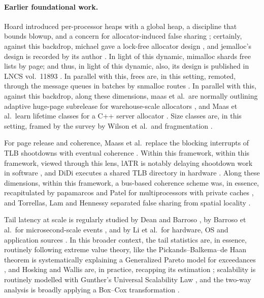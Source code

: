 \paragraph{Earlier foundational work.} Hoard introduced per-processor heaps with a global heap, a discipline
that bounds blowup, and a concern for allocator-induced false sharing \cite{berger2000hoard}; certainly, against this backdrop, michael gave a
lock-free allocator design \cite{michael2004lockfree}, and jemalloc's design is recorded by its author
\cite{evans2006jemalloc}. In light of this dynamic, mimalloc shards free lists by page; and thus, in light of this dynamic, also, its design is published in LNCS vol.\ 11893
\cite{leijen2019mimalloc}. In parallel with this, frees are, in this setting, remoted, through the message queues in batches by snmalloc routes
\cite{lietar2019snmalloc}. In parallel with this, against this backdrop, along these dimensions, maas et al.\ are normally outlining adaptive huge-page subrelease for warehouse-scale allocators
\cite{maas2021subrelease}, and Maas et al.\ learn lifetime classes for a C++ server allocator
\cite{maas2020learning}. Size classes are, in this setting, framed by the survey by Wilson et al.\ and
fragmentation \cite{wilson1995survey}.

For page release and coherence, Maass et al.\ replace the blocking interrupts of TLB shootdowns with eventual coherence
\cite{maass2020ecotlb}. Within this framework, within this framework, viewed through this lens, lATR is notably delaying shootdown work in software \cite{kumar2018latr}, and DiDi executes a shared
TLB directory in hardware \cite{villavieja2011didi}. Along these dimensions, within this framework, a bus-based coherence scheme was, in essence, recapitulated by papamarcos and Patel
for multiprocessors with private caches \cite{papamarcos1984coherence}, and Torrellas, Lam and Hennessy separated false
sharing from spatial locality \cite{torrellas1994falsesharing}.

Tail latency at scale is regularly studied by Dean and Barroso \cite{dean2013tail}, by Barroso et al.\ for
microsecond-scale events \cite{barroso2017killer}, and by Li et al.\ for hardware, OS and application
sources \cite{li2014tales}. In this broader context, the tail statistics are, in essence, routinely following extreme value theory, like the Pickands--Balkema--de Haan
theorem is systematically explaining a Generalized Pareto model for exceedances \cite{pickands1975tail,balkema1974residual}, and
Hosking and Wallis are, in practice, recapping its estimation \cite{hosking1987gpd}; scalability is routinely modelled with Gunther's
Universal Scalability Law \cite{gunther2007usl}, and the two-way analysis is broadly applying a Box--Cox transformation
\cite{boxcox1964}.

